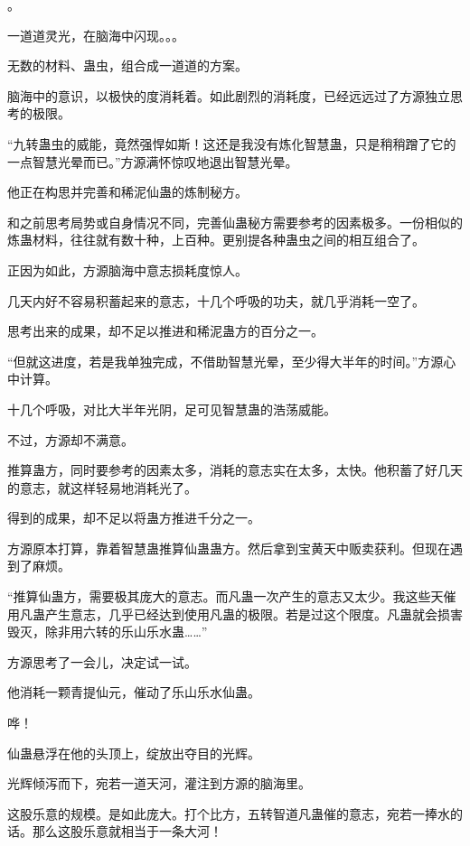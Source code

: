 
\begin{this_body}

。

一道道灵光，在脑海中闪现。。。

无数的材料、蛊虫，组合成一道道的方案。

脑海中的意识，以极快的度消耗着。如此剧烈的消耗度，已经远远过了方源独立思考的极限。

“九转蛊虫的威能，竟然强悍如斯！这还是我没有炼化智慧蛊，只是稍稍蹭了它的一点智慧光晕而已。”方源满怀惊叹地退出智慧光晕。

他正在构思并完善和稀泥仙蛊的炼制秘方。

和之前思考局势或自身情况不同，完善仙蛊秘方需要参考的因素极多。一份相似的炼蛊材料，往往就有数十种，上百种。更别提各种蛊虫之间的相互组合了。

正因为如此，方源脑海中意志损耗度惊人。

几天内好不容易积蓄起来的意志，十几个呼吸的功夫，就几乎消耗一空了。

思考出来的成果，却不足以推进和稀泥蛊方的百分之一。

“但就这进度，若是我单独完成，不借助智慧光晕，至少得大半年的时间。”方源心中计算。

十几个呼吸，对比大半年光阴，足可见智慧蛊的浩荡威能。

不过，方源却不满意。

推算蛊方，同时要参考的因素太多，消耗的意志实在太多，太快。他积蓄了好几天的意志，就这样轻易地消耗光了。

得到的成果，却不足以将蛊方推进千分之一。

方源原本打算，靠着智慧蛊推算仙蛊蛊方。然后拿到宝黄天中贩卖获利。但现在遇到了麻烦。

“推算仙蛊方，需要极其庞大的意志。而凡蛊一次产生的意志又太少。我这些天催用凡蛊产生意志，几乎已经达到使用凡蛊的极限。若是过这个限度。凡蛊就会损害毁灭，除非用六转的乐山乐水蛊……”

方源思考了一会儿，决定试一试。

他消耗一颗青提仙元，催动了乐山乐水仙蛊。

哗！

仙蛊悬浮在他的头顶上，绽放出夺目的光辉。

光辉倾泻而下，宛若一道天河，灌注到方源的脑海里。

这股乐意的规模。是如此庞大。打个比方，五转智道凡蛊催的意志，宛若一捧水的话。那么这股乐意就相当于一条大河！


\end{this_body}
